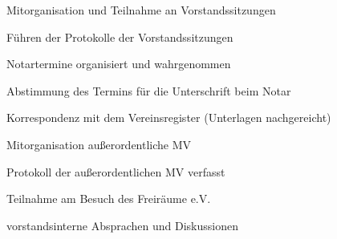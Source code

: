 \documentclass[ngerman]{scrartcl}
\begin{document}
\begin{compactitem}
    \item Mitorganisation und Teilnahme an Vorstandssitzungen
    \item Führen der Protokolle der Vorstandssitzungen
    \item Notartermine organisiert und wahrgenommen
    \item Abstimmung des Termins für die Unterschrift beim Notar
    \item Korrespondenz mit dem Vereinsregister (Unterlagen nachgereicht)
    \item Mitorganisation außerordentliche MV
    \item Protokoll der außerordentlichen MV verfasst
    \item Teilnahme am Besuch des Freiräume e.V.
    \item vorstandsinterne Absprachen und Diskussionen  
\end{compactitem}
\end{document}
